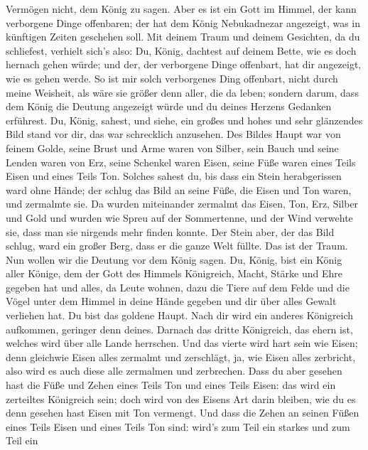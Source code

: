 Vermögen nicht, dem König zu sagen.  Aber es ist ein Gott
im Himmel, der kann verborgene Dinge offenbaren; der hat dem König
Nebukadnezar angezeigt, was in künftigen Zeiten geschehen soll.
 Mit deinem Traum und deinem Gesichten, da du schliefest,
verhielt sich's also: Du, König, dachtest auf deinem Bette, wie es doch
hernach gehen würde; und der, der verborgene Dinge offenbart, hat dir
angezeigt, wie es gehen werde.  So ist mir solch
verborgenes Ding offenbart, nicht durch meine Weisheit, als wäre sie
größer denn aller, die da leben; sondern darum, dass dem König die
Deutung angezeigt würde und du deines Herzens Gedanken erführest.
 Du, König, sahest, und siehe, ein großes und hohes und
sehr glänzendes Bild stand vor dir, das war schrecklich anzusehen.
 Des Bildes Haupt war von feinem Golde, seine Brust und
Arme waren von Silber, sein Bauch und seine Lenden waren von Erz,
 seine Schenkel waren Eisen, seine Füße waren eines Teils
Eisen und eines Teils Ton.  Solches sahest du, bis dass ein
Stein herabgerissen ward ohne Hände; der schlug das Bild an seine Füße,
die Eisen und Ton waren, und zermalmte sie.  Da wurden
miteinander zermalmt das Eisen, Ton, Erz, Silber und Gold und wurden wie
Spreu auf der Sommertenne, und der Wind verwehte sie, dass man sie
nirgends mehr finden konnte. Der Stein aber, der das Bild schlug, ward
ein großer Berg, dass er die ganze Welt füllte.  Das ist
der Traum. Nun wollen wir die Deutung vor dem König sagen. 
Du, König, bist ein König aller Könige, dem der Gott des Himmels
Königreich, Macht, Stärke und Ehre gegeben hat  und alles,
da Leute wohnen, dazu die Tiere auf dem Felde und die Vögel unter dem
Himmel in deine Hände gegeben und dir über alles Gewalt verliehen hat.
Du bist das goldene Haupt.  Nach dir wird ein anderes
Königreich aufkommen, geringer denn deines. Darnach das dritte
Königreich, das ehern ist, welches wird über alle Lande herrschen.
 Und das vierte wird hart sein wie Eisen; denn gleichwie
Eisen alles zermalmt und zerschlägt, ja, wie Eisen alles zerbricht, also
wird es auch diese alle zermalmen und zerbrechen.  Dass du
aber gesehen hast die Füße und Zehen eines Teils Ton und eines Teils
Eisen: das wird ein zerteiltes Königreich sein; doch wird von des Eisens
Art darin bleiben, wie du es denn gesehen hast Eisen mit Ton vermengt.
 Und dass die Zehen an seinen Füßen eines Teils Eisen und
eines Teils Ton sind: wird's zum Teil ein starkes und zum Teil ein
